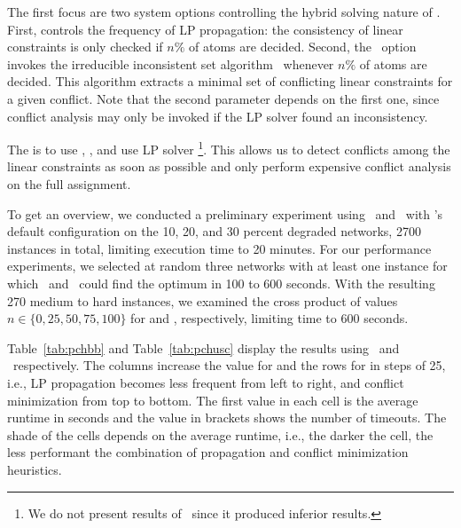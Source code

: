 The first focus are two system options controlling the hybrid solving nature of \fluto.
First,  controls the frequency of LP propagation:
the consistency of linear constraints is only checked if $n\%$ of atoms are decided.
Second,
the \fluto\ option  invokes the irreducible inconsistent set algorithm~\citep{ostsch12a} whenever $n\%$ of atoms are decided.
This algorithm extracts a minimal set of conflicting linear constraints for a given conflict.
Note that the second parameter depends on the first one,
since conflict analysis may only be invoked if the LP solver found an inconsistency.

The  is to use , , and use LP solver \cplex\footnote{We do not present results of \lpsolve\ since it produced inferior results.}.
This allows us to detect conflicts among the linear constraints as soon as possible and only perform expensive conflict analysis on the full assignment.

To get an overview, we conducted a preliminary experiment
using \bb\ and \usc\ with \fluto's default configuration on the 10, 20, and 30 percent degraded networks,
2700 instances in total,
limiting execution time to 20 minutes.
For our performance experiments,
we selected at random three networks with at least one instance
for which \bb\ and \usc\ could find the optimum in 100 to 600 seconds.
With the resulting 270 medium to hard instances,
we examined the cross product of values $n\in\{0,25,50,75,100\}$ for  and , respectively, limiting time to 600 seconds.

Table~\ref{tab:pchbb} and Table~\ref{tab:pchusc} display the results using \bb\ and \usc\ respectively.
The columns increase the value for  and the rows for  in steps of 25,
i.e., LP propagation becomes less frequent from left to right,
and conflict minimization from top to bottom.
The first value in each cell is the average runtime in seconds and the value in brackets shows the number of timeouts.
The shade of the cells depends on the average runtime,
i.e., the darker the cell, the less performant the combination of propagation and conflict minimization heuristics.

